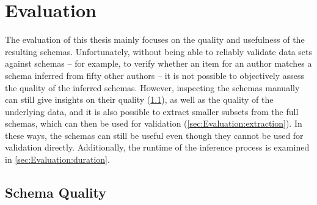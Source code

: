 
\chapter{Evaluation}
\label{ch:Evaluation}

The evaluation of this thesis
mainly focuses on the quality and usefulness of the resulting \glspl{schema}.
Unfortunately, without being able to reliably validate data sets against \glspl{schema} –
for example, to verify whether an \gls{item} for an author
matches a \gls{schema} inferred from fifty other authors –
it is not possible to objectively assess the quality of the inferred \glspl{schema}.
However, inspecting the \glspl{schema} manually
can still give insights on their quality (\cref{sec:Evaluation:quality}),
as well as the quality of the underlying data,
and it is also possible to extract smaller subsets from the full \glspl{schema},
which can then be used for validation (\cref{sec:Evaluation:extraction}).
In these ways, the \glspl{schema} can still be useful even though they cannot be used for validation directly.
Additionally, the runtime of the inference process is examined in \cref{sec:Evaluation:duration}.

\section{Schema Quality}
\label{sec:Evaluation:quality}

